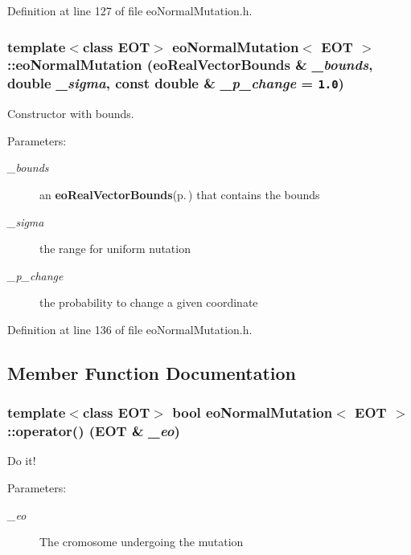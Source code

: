 Definition at line 127 of file eo\-Normal\-Mutation.h.
\subsubsection{\setlength{\rightskip}{0pt plus 5cm}template$<$class EOT$>$ {\bf eo\-Normal\-Mutation}$<$ {\bf EOT} $>$::{\bf eo\-Normal\-Mutation} ({\bf eo\-Real\-Vector\-Bounds} \& {\em \_\-bounds}, double {\em \_\-sigma}, const double \& {\em \_\-p\_\-change} = {\tt 1.0})\hspace{0.3cm}{\tt  [inline]}}\label{classeo_normal_mutation_a1}


Constructor with bounds. 

\begin{Desc}
\item[Parameters:]
\begin{description}
\item[{\em \_\-bounds}]an {\bf eo\-Real\-Vector\-Bounds}{\rm (p.\,\pageref{classeo_real_vector_bounds})} that contains the bounds \item[{\em \_\-sigma}]the range for uniform nutation \item[{\em \_\-p\_\-change}]the probability to change a given coordinate \end{description}
\end{Desc}


Definition at line 136 of file eo\-Normal\-Mutation.h.

\subsection{Member Function Documentation}
\subsubsection{\setlength{\rightskip}{0pt plus 5cm}template$<$class EOT$>$ bool {\bf eo\-Normal\-Mutation}$<$ {\bf EOT} $>$::operator() ({\bf EOT} \& {\em \_\-eo})\hspace{0.3cm}{\tt  [inline, virtual]}}\label{classeo_normal_mutation_a3}


Do it! 

\begin{Desc}
\item[Parameters:]
\begin{description}
\item[{\em \_\-eo}]The cromosome undergoing the mutation \end{description}
\end{Desc}


